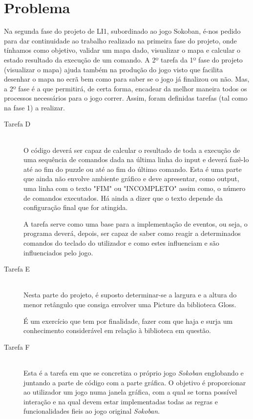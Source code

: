 \documentclass[a4paper]{article}
\begin{document}
\section{Problema}
\label{sec:problema}

Na segunda fase do projeto de LI1, subordinado ao jogo Sokoban, é-nos pedido para dar continuidade ao trabalho realizado na primeira fase do projeto, onde tínhamos como objetivo, validar um mapa dado, visualizar o mapa e calcular o estado resultado da execução de um comando. A 2º tarefa da 1º fase do projeto (visualizar o mapa) ajuda também na produção do jogo visto que facilita desenhar o mapa no ecrã bem como para saber se o jogo já finalizou ou não.
Mas, a 2º fase é a que permitirá, de certa forma, encadear da melhor maneira todos os processos necessários para o jogo correr. Assim, foram definidas tarefas (tal como na fase 1) a realizar.
\begin{description}
\item[Tarefa D]\hfill \\ 
O código deverá ser capaz de calcular o resultado de toda a execução de uma sequência de comandos dada na última linha do input e deverá fazê-lo até ao fim do puzzle ou até ao fim do último comando. Esta é uma parte que ainda não envolve ambiente gráfico e deve apresentar, como output, uma linha com o texto "FIM" ou "INCOMPLETO" assim como, o número de comandos executados. Há ainda a dizer que o texto depende da configuração final que for atingida.

A tarefa serve como uma base para a implementação de eventos, ou seja, o programa deverá, depois, ser capaz de saber como reagir a determinados comandos do teclado do utilizador e como estes influenciam e são influenciados pelo jogo.
\item[Tarefa E]\hfill \\ 
Nesta parte do projeto, é suposto determinar-se a largura e a altura do menor retângulo que consiga envolver uma Picture da biblioteca Gloss. 

É um exercício que tem por finalidade, fazer com que haja e surja um conhecimento considerável em relação à biblioteca em questão.
\item[Tarefa F]\hfill \\
Esta é a tarefa em que se concretiza o próprio jogo \emph{Sokoban} englobando e juntando a parte de código com a parte gráfica. O objetivo é proporcionar ao utilizador um jogo numa janela gráfica, com a qual se torna possível interação e na qual devem estar implementadas todas as regras e funcionalidades fieis ao jogo original \emph{Sokoban}.

\end{description}
\end{document}
